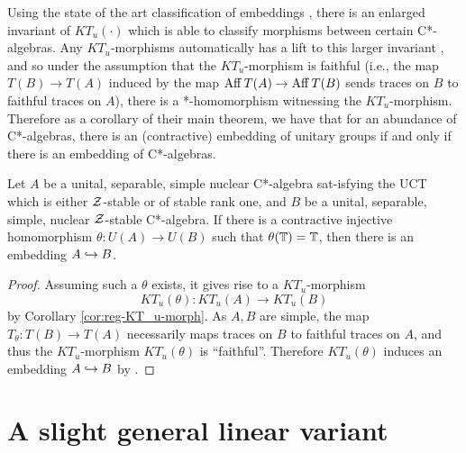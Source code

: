 \documentclass[12pt]{amsart}
\begin{document}
Using the state of the art classification of embeddings \cite{CGSTW23}, there is an enlarged invariant of $KT_u(\cdot)$ which is able to classify morphisms between certain C*-algebras. Any $KT_u$-morphisms automatically has a lift to this larger invariant \cite[Theorem 3.9]{CGSTW23}, and so under the assumption that the $KT_u$-morphism is faithful (i.e., the map $T(B) \to T(A)$ induced by the map $\operatorname{Aff} T(A) \to \operatorname{Aff} T(B)$ sends traces on $B$ to faithful traces on $A$), there is a *-homomorphism witnessing the $KT_u$-morphism. Therefore as a corollary of their main theorem, we have that for an abundance of C*-algebras, there is an (contractive) embedding of unitary groups if and only if there is an embedding of C*-algebras.

\begin{cor}\label{cor:ugh-subgroup-subalgebra}
Let $A$ be a unital, separable, simple nuclear C*-algebra sat\hyp{}isfying the UCT which is either $\mathcal{Z}$-stable or of stable rank one, and $B$ be a unital, separable, simple, nuclear $\mathcal{Z}$-stable C*-algebra. If there is a contractive injective homomorphism $\theta:U(A) \to U(B)$ such that $\theta(\mathbb{T}) = \mathbb{T}$, then there is an embedding $A \hookrightarrow B$. 
\begin{proof}
Assuming such a $\theta$ exists, it gives rise to a $KT_u$-morphism
\begin{equation}
KT_u(\theta): KT_u(A) \to KT_u(B)
\end{equation}
by Corollary \ref{cor:reg-KT_u-morph}. As $A,B$ are simple, the map $T_\theta: T(B) \to T(A)$ necessarily maps traces on $B$ to faithful traces on $A$, and thus the $KT_u$-morphism $KT_u(\theta)$ is ``faithful''. Therefore $KT_u(\theta)$ induces an embedding $A \hookrightarrow B$ by \cite[Theorem B]{CGSTW23}. 
\end{proof}
\end{cor}
 

\section{A slight general linear variant}\label{section:ugh-general-linear-variants}
\end{document}
